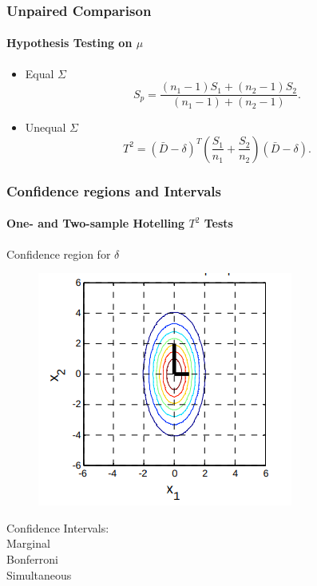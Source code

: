 \documentclass[aspectratio=169,10pt,t]{beamer}
\begin{document}
\begin{frame}[t]
	\frametitle{Unpaired Comparison }
	\framesubtitle{Hypothesis Testing on $\mu$}
	
	\begin{itemize}
		\item Equal $\Sigma$\\
			\[
			S_p = 
			\frac{  \left( n_1 -1  \right) S_1 +  \left( n_2 -1  \right) S_2}
			{ \left( n_1 -1  \right) +  \left( n_2 -1  \right) } 
			.\] 
		\item Unequal $\Sigma$ 
			\[
			T^{2} =
			\left( \bar{D} - \delta  \right) ^{T}
			\left( \frac{S_1}{n_1} + \frac{S_2}{n_2}  \right) 
			\left( \bar{D} - \delta  \right)
			.\] 
	\end{itemize}
\end{frame}

\begin{frame}[t]
	\frametitle{Confidence regions and Intervals}
	\framesubtitle{One- and Two-sample Hotelling $T^2$ Tests}
	Confidence region for $\delta$ 
	\begin{figure}[h]
		\centering
		\includegraphics[width=0.35\linewidth]{../01/images/1.png}
	\end{figure}
	 Confidence Intervals: \\
        \quad Marginal \\
        \quad Bonferroni \\
        \quad Simultaneous \\
\end{frame}
\end{document}
